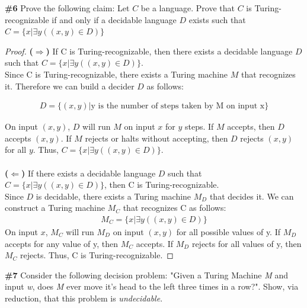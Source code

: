 \documentclass{article}
\newcommand{\problem}[1]{\textbf{\##1}}
\newcommand{\prob}[1]{\problem{#1}}
\begin{document}
\pagebreak

\prob{6} Prove the following claim: Let $C$ be a language. Prove that $C$ is Turing-recognizable if and only if a decidable language $D$ exists such that $C=\{x | \exists y ((x,y) \in D)\}$

\begin{proof}
    \textbf{($\Rightarrow$)} If C is Turing-recognizable, then there exists a decidable language $D$ such that $C = \{x | \exists y ((x,y) \in D)\}$.\\

    Since C is Turing-recognizable, there exists a Turing machine $M$ that recognizes it. Therefore we can build a decider $D$ as follows:

    \begin{align*}
        D = \{(x,y) | \text{y is the number of steps taken by M on input x}\}    
    \end{align*}

    On input $(x,y)$, $D$ will run $M$ on input $x$ for $y$ steps. If $M$ accepts, then $D$ accepts $(x,y)$. If $M$ rejects or halts without accepting, then $D$ rejects $(x,y)$ for all $y$. Thus, $C = \{x | \exists y ((x,y) \in D)\}$.\\
    \\
    \textbf{($\Leftarrow$)} If there exists a decidable language $D$ such that $C = \{x | \exists y ((x,y) \in D)\}$, then C is Turing-recognizable.\\
    Since $D$ is decidable, there exists a Turing machine $M_D$ that decides it. We can construct a Turing machine $M_C$ that recognizes C as follows:
    \begin{align*}
        M_C = \{x | \exists y ((x,y) \in D)\}
    \end{align*}
    On input $x$, $M_C$ will run $M_D$ on input $(x,y)$ for all possible values of y. If $M_D$ accepts for any value of y, then $M_C$ accepts. If $M_D$ rejects for all values of y, then $M_C$ rejects. Thus, C is Turing-recognizable.  
\end{proof}
\pagebreak

\prob{7} Consider the following decision problem: "Given a Turing Machine \emph{M} and input \emph{w}, does \emph{M} ever move it's head to the left three times in a row?". Show, via reduction, that this problem is \emph{undecidable}.
\end{document}
